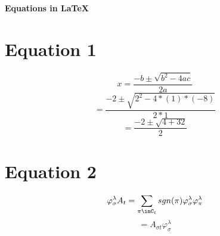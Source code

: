 \documentclass[10pt,a4paper]{article}
\begin{document}
 
\begin{center} 
\Large{\textbf{Equations in \LaTeX}}  
\end{center}  
\section*{Equation 1}  
\begin{fleqn}  
\[ 
x = \frac{-b \pm \sqrt{b^{2}-4ac}}{2a}  
\] 
\[ = 
\frac{-2 \pm \sqrt{2^{2}-4*(1)*(-8)}}{2*1} 
\] 
\[  
= \frac{-2 \pm \sqrt{4+32}}{2} 
\] 
\end{fleqn} 
\section*{Equation 2} 
\begin{fleqn} 
\[ 
\varphi^{\lambda}_{\sigma}A_{t} =\sum_{\pi\inC_{t}} 
sgn(\pi)\varphi^{\lambda}_{\sigma}\varphi^{\lambda}_{\pi} 
\]  
\[ 
=A_{\sigma t} \varphi^{\lambda}_{\sigma} 
\]  
\end{fleqn}  
\end{document}
